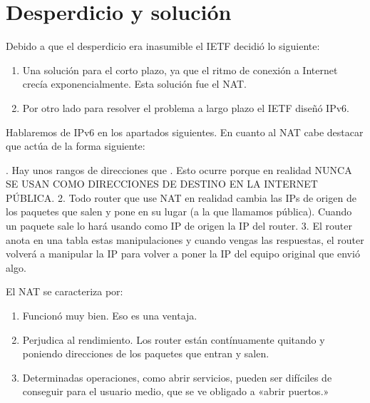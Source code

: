 \documentclass[letterpaper,10pt,spanish]{sphinxmanual}
\begin{document}
\section{Desperdicio y solución}
\label{\detokenize{t2_integracion_elementos/apuntes_t2:desperdicio-y-solucion}}
\sphinxAtStartPar
Debido a que el desperdicio era inasumible el IETF decidió lo siguiente:
\begin{enumerate}
%
\item {} 
\sphinxAtStartPar
Una solución para el corto plazo, ya que el ritmo de conexión a Internet crecía exponencialmente. Esta solución fue el NAT.

\item {} 
\sphinxAtStartPar
Por otro lado para resolver el problema a largo plazo el IETF diseñó IPv6.

\end{enumerate}

\sphinxAtStartPar
Hablaremos de IPv6 en los apartados siguientes. En cuanto al NAT cabe destacar que actúa de la forma siguiente:

.\sphinxhyphen{} Hay unos rangos de direcciones que . Esto ocurre porque en realidad NUNCA SE USAN COMO DIRECCIONES DE DESTINO EN LA INTERNET PÚBLICA.
2. Todo router que use NAT en realidad cambia las IPs de origen de los paquetes que salen y pone en su lugar  (a la que llamamos pública). Cuando un paquete sale lo hará usando como IP de origen la IP del router.
3. El router anota en una tabla estas manipulaciones y cuando vengas las respuestas, el router volverá a manipular la IP para volver a poner la IP del equipo original que envió algo.

\sphinxAtStartPar
El NAT se caracteriza por:
\begin{enumerate}
%
\item {} 
\sphinxAtStartPar
Funcionó muy bien. Eso es una ventaja.

\item {} 
\sphinxAtStartPar
Perjudica al rendimiento. Los router están contínuamente quitando y poniendo direcciones de los paquetes que entran y salen.

\item {} 
\sphinxAtStartPar
Determinadas operaciones, como abrir servicios, pueden ser difíciles de conseguir para el usuario medio, que se ve obligado a «abrir puertos.»

\end{enumerate}
\end{document}
